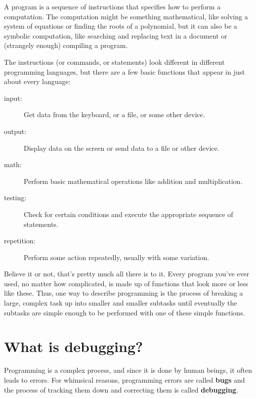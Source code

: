 A program is a sequence of instructions that specifies how to perform
a computation.  The computation might be something mathematical, like
solving a system of equations or finding the roots of a polynomial,
but it can also be a symbolic computation, like searching and
replacing text in a document or (strangely enough) compiling a
program.


The instructions (or commands, or statements) look different in
different programming languages, but there are a few basic functions
that appear in just about every language:

\begin{description}

\item[input:] Get data from the keyboard, or a file, or some
other device.

\item[output:] Display data on the screen or send data to a
file or other device.

\item[math:] Perform basic mathematical operations like addition and
multiplication.

\item[testing:] Check for certain conditions and execute the
appropriate sequence of statements.

\item[repetition:] Perform some action repeatedly, usually with
some variation.

\end{description}

Believe it or not, that's pretty much all there is to it.
Every program you've ever used, no matter how complicated, is
made up of functions that look more or less like these.  Thus,
one way to describe programming is the process of breaking a
large, complex task up into smaller and smaller subtasks
until eventually the subtasks are simple enough to be performed
with one of these simple functions.

\section{What is debugging?}

Programming is a complex process, and since it is done by
human beings, it often leads to errors.  For whimsical reasons,
programming errors are called {\bf bugs} and the process
of tracking them down and correcting them is called
{\bf debugging}.

